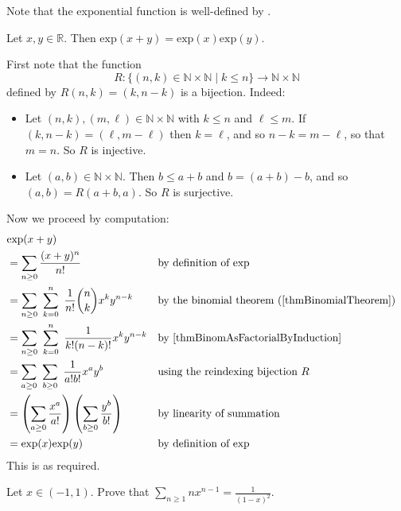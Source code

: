 Note that the exponential function is well-defined by .

\begin{theorem}
\label{thmExpIsMultiplicative}
Let $x,y \in \mathbb{R}$. Then $\mathrm{exp}(x+y) = \mathrm{exp}(x) \mathrm{exp}(y)$.
\end{theorem}

\begin{cproof}
First note that the function
\[ R : \{ (n,k) \in \mathbb{N} \times \mathbb{N} \mid k \le n \} \to \mathbb{N} \times \mathbb{N} \]
defined by $R(n,k) = (k,n-k)$ is a bijection. Indeed:
\begin{itemize}
\item Let $(n,k), (m,\ell) \in \mathbb{N} \times \mathbb{N}$ with $k \le n$ and $\ell \le m$. If $(k,n-k) = (\ell,m-\ell)$ then $k=\ell$, and so $n-k = m-\ell$, so that $m=n$. So $R$ is injective.
\item Let $(a,b) \in \mathbb{N} \times \mathbb{N}$. Then $b \le a+b$ and $b = (a+b) - b$, and so $(a,b) = R(a+b,a)$. So $R$ is surjective.
\end{itemize}

Now we proceed by computation:
\begin{align*}
& \mathrm{exp}(x+y) \\
&= \sum_{n \ge 0} \dfrac{(x+y)^n}{n!} && \text{by definition of $\mathrm{exp}$} \\
&= \sum_{n \ge 0} ~ \sum_{k=0}^n ~ \dfrac{1}{n!} \binom{n}{k} x^k y^{n-k} && \text{by the binomial theorem (\Cref{thmBinomialTheorem})} \\
&= \sum_{n \ge 0} ~ \sum_{k=0}^n ~ \dfrac{1}{k! (n-k)!} x^k y^{n-k} && \text{by \Cref{thmBinomAsFactorialByInduction}} \\
&= \sum_{a \ge 0} ~ \sum_{b \ge 0} ~ \dfrac{1}{a! b!} x^a y^b && \text{using the reindexing bijection $R$} \\
&= \left( \sum_{a \ge 0} \dfrac{x^a}{a!} \right) \left( \sum_{b \ge 0} \dfrac{y^b}{b!} \right) && \text{by linearity of summation} \\
&= \mathrm{exp}(x) \mathrm{exp}(y) && \text{by definition of $\mathrm{exp}$}
\end{align*}
This is as required.
\end{cproof}

\begin{exercise}
Let $x \in (-1,1)$. Prove that $\displaystyle \sum_{n \ge 1} nx^{n-1} = \frac{1}{(1-x)^2}$.
\end{exercise}

